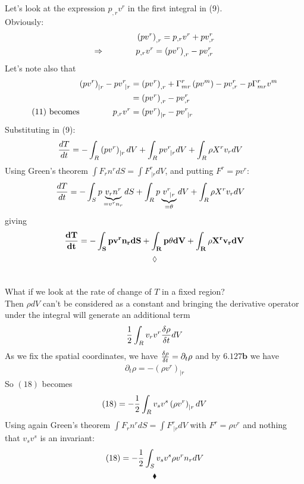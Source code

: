 Let's look at the expression $p_{,r}v^r$ in the first integral in (9).\\
Obviously:
\begin{align}
&\left(pv^r\right)_{,r} = p_{,r}v^r+pv^r_{,r}\\
\Rightarrow \quad\quad\quad\quad&p_{,r}v^r = \left(pv^r\right)_{,r} -pv^r_{,r}
\end{align}
Let's note also that
\begin{align}
\left(pv^r\right)_{|r} -pv^r_{\ |r} &=  \left(pv^r\right)_{,r} +\Gamma^{r}_{mr}\left(pv^m\right)-pv^r_{,r}-p\Gamma^{r}_{mr}v^m \\
&=  \left(pv^r\right)_{,r}-pv^r_{,r} \\
\text{(11) becomes}\quad\quad\quad\quad p_{,r}v^r&=\left(pv^r\right)_{|r} -pv^r_{\ |r}
\end{align}
Substituting in (9):
\begin{align}
\dv{T}{t} &=-\int_R \left(pv^r\right)_{|r} dV+\int_R pv^r_{\ |r} dV+\int_R \rho X^rv_r dV 
\end{align}
Using Green's theorem $ \int F_rn^rdS = \int F^r_{\ |r}dV$, and putting $ F^r=pv^r$:  
\begin{align}
\dv{T}{t} &=-\int_S p\underbrace{v_r n^r}_{=v^r n_r } dS+\int_R p\underbrace{v^r_{\ |r}}_{=\theta} dV+\int_R \rho X^rv_r dV 
\end{align}
giving
\begin{align}
\mathbf{\dv{T}{t} =-\int_S p v^r n_rdS+\int_R p\theta dV+\int_R \rho X^rv_r dV} 
\end{align}
$$\lozenge$$\\\\
What if we look at the rate of change of $T$ in a fixed region?\\
Then $\rho dV$ can't be considered as a constant and bringing the derivative operator under the integral will generate an additional term
\begin{align}
\half\int_R v_rv^r \fdv{\rho}{t} dV
\end{align}
As we fix the spatial coordinates, we have $\fdv{\rho}{t}= \partial_t \rho$ and by $\mathbf{6.127b}$ we have 
\begin{align}
\partial_t \rho= -\left(\rho v^r\right)_{|r}
\end{align}
So $(18)$ becomes
\begin{align}
\text{(18)}=-\frac{1}{2}\int_R v_sv^s \left(\rho v^r\right)_{|r} dV
\end{align}
Using again Green's theorem $ \int F_rn^rdS = \int F^r_{\ |r}dV$ with   $ F^r=\rho v^r$ and nothing that $v_sv^s$ is an invariant: 
\begin{align}
\text{(18)}=-\frac{1}{2}\int_S v_sv^s \rho v^rn_r dV
\end{align}
 $$\blacklozenge$$
\newpage



